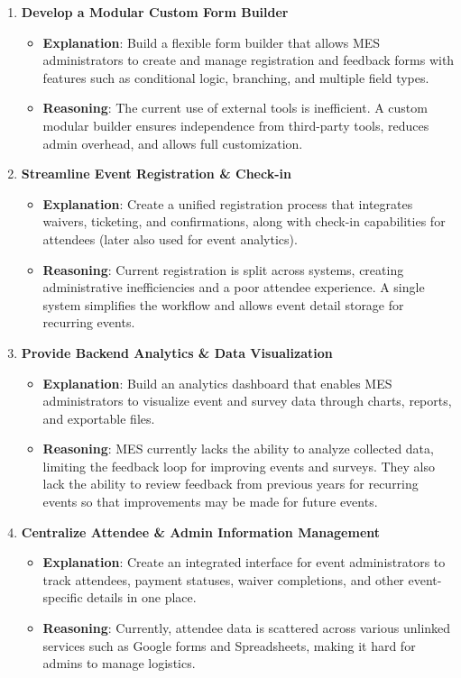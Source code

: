 \documentclass{article}
\begin{document}
\begin{enumerate}
    \item \textbf{Develop a Modular Custom Form Builder}
    \begin{itemize}
        \item \textbf{Explanation}: Build a flexible form builder that allows MES administrators to create and manage registration and feedback forms with features such as conditional logic, branching, and multiple field types.
        \item \textbf{Reasoning}: The current use of external tools is inefficient. A custom modular builder ensures independence from third-party tools, reduces admin overhead, and allows full customization.
    \end{itemize}

    \item \textbf{Streamline Event Registration \& Check-in}
    \begin{itemize}
        \item \textbf{Explanation}: Create a unified registration process that integrates waivers, ticketing, and confirmations, along with check-in capabilities for attendees (later also used for event analytics).
        \item \textbf{Reasoning}: Current registration is split across systems, creating administrative inefficiencies and a poor attendee experience. A single system simplifies the workflow and allows event detail storage for recurring events.
    \end{itemize}

    \item \textbf{Provide Backend Analytics \& Data Visualization}
    \begin{itemize}
        \item \textbf{Explanation}: Build an analytics dashboard that enables MES administrators to visualize event and survey data through charts, reports, and exportable files.
        \item \textbf{Reasoning}: MES currently lacks the ability to analyze collected data, limiting the feedback loop for improving events and surveys. They also lack the ability to review feedback from previous years for recurring events so that improvements may be made for future events.
    \end{itemize}

    \item \textbf{Centralize Attendee \& Admin Information Management}
    \begin{itemize}
        \item \textbf{Explanation}: Create an integrated interface for event administrators to track attendees, payment statuses, waiver completions, and other event-specific details in one place.
        \item \textbf{Reasoning}: Currently, attendee data is scattered across various unlinked services such as Google forms and Spreadsheets, making it hard for admins to manage logistics.
    \end{itemize}


\end{enumerate}
\end{document}
